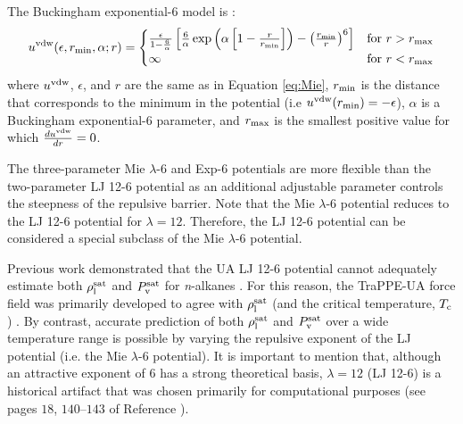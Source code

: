 \documentclass[preprint,letterpaper,floatfix,citeautoscript,aip,jcp]{revtex4-1}
\begin{document}
The Buckingham exponential-6 model is \cite{Exp6}:
\begin{equation} \label{eq:Buckingham}
u^{\rm vdw}(\epsilon,r_{\rm min},\alpha;r) = 
\begin{cases}
\frac{\epsilon}{1-\frac{6}{\alpha}} \left[\frac{6}{\alpha} \exp\left(\alpha\left[1-\frac{r}{r_{\rm min}}\right]\right) - \left(\frac{r_{\rm min}}{r}\right)^6\right] & \text{for}\ r>r_{\rm max} \\
\infty           & \text{for}\ r<r_{\rm max}
\end{cases}
\end{equation}
where $u^{\rm vdw}$, $\epsilon$, and $r$ are the same as in Equation \ref{eq:Mie}, $r_{\rm min}$ is the distance that corresponds to the minimum in the potential (i.e $u^{\rm vdw}(r_{\rm min})=-\epsilon$), $\alpha$ is a Buckingham exponential-6 parameter, and $r_{\rm max}$ is the smallest positive value for which $\frac{du^{\rm vdw}}{dr}=0$.

The three-parameter Mie $\lambda$-6 and Exp-6 potentials are more flexible than the two-parameter LJ 12-6 potential as an additional adjustable parameter controls the steepness of the repulsive barrier. Note that the Mie $\lambda$-6 potential reduces to the LJ 12-6 potential for $\lambda = 12$. Therefore, the LJ 12-6 potential can be considered a special subclass of the Mie $\lambda$-6 potential. 


Previous work demonstrated that the UA LJ 12-6 potential cannot adequately estimate both $\rho_{\rm l}^{\rm sat}$ and $P_{\rm v}^{\rm sat}$ for \textit{n}-alkanes \cite{Pareto_LJPQ,Mess4}. For this reason, the TraPPE-UA force field was primarily developed to agree with $\rho_{\rm l}^{\rm sat}$ (and the critical temperature, $T_{\rm c}$) \cite{TraPPE}. By contrast, accurate prediction of both $\rho_{\rm l}^{\rm sat}$ and $P_{\rm v}^{\rm sat}$ over a wide temperature range is possible by varying the repulsive exponent of the LJ potential (i.e. the Mie $\lambda$-6 potential). It is important to mention that, although an attractive exponent of 6 has a strong theoretical basis, $\lambda = 12$ (LJ 12-6) is a historical artifact that was chosen primarily for computational purposes (see pages $18$, $140$--$143$ of Reference ).
\end{document}
